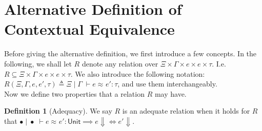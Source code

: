 \documentclass[twoside,11pt,openright]{report}
\theoremstyle{definition}
\newtheorem{definition}{Definition}[section]
\newcommand{\expr}{e}
\newcommand{\Tunit}{\mathsf{Unit}}
\newcommand{\typ}{\tau}
\newcommand{\venv}{\Gamma}
\newcommand{\tenv}{\Xi}
\newcommand{\empvenv}{\bullet}
\newcommand{\emptenv}{\bullet}
\newcommand{\jdgRel}[6]{#1 \; | \; #2 \; \vdash #3 \approx^{#4} #5 : #6}
\begin{document}
\section{Alternative Definition of Contextual Equivalence}
Before giving the alternative definition, we first introduce a few concepts. In the following, we shall let $R$ denote any relation over $\tenv \times \venv \times \expr \times \expr \times \typ$. I.e. $R \subseteq \tenv \times \venv \times \expr \times \expr \times \typ$. We also introduce the following notation: $R(\tenv, \venv, \expr, \expr', \typ) \triangleq \jdgRel{\tenv}{\venv}{\expr}{}{\expr'}{\typ}$, and use them interchangeably.\\
Now we define two properties that a relation $R$ may have.
\begin{definition}[Adequacy]
  We say $R$ is an adequate relation when it holds for $R$ that $\jdgRel{\empvenv}{\emptenv}{\expr}{}{\expr'}{\Tunit} \implies \expr \Downarrow \iff \expr' \Downarrow$.
\end{definition}
\end{document}
